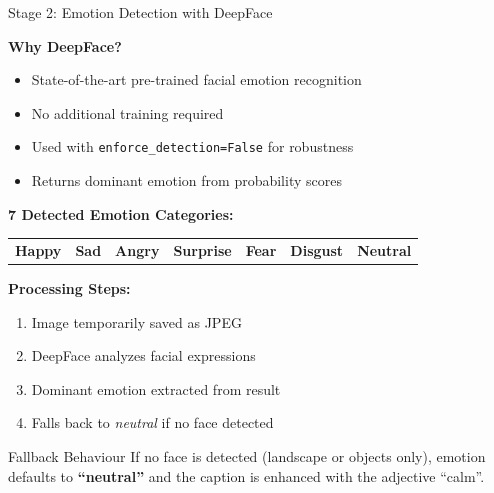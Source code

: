 \documentclass{beamer}
\begin{document}
\begin{frame}{Stage 2: Emotion Detection with DeepFace}

    \textbf{Why DeepFace?}
    \begin{itemize}
        \item State-of-the-art pre-trained facial emotion recognition
        \item No additional training required
        \item Used with \texttt{enforce\_detection=False} for robustness
        \item Returns dominant emotion from probability scores
    \end{itemize}

    \vspace{0.05cm}
    \textbf{7 Detected Emotion Categories:}\\[0.2em]
    \begin{center}
    \begin{tabular}{ccccccc}
    \textcolor{yellow!60!black}{\textbf{Happy}} &
    \textcolor{blue!60!black}{\textbf{Sad}} &
    \textcolor{red!70!black}{\textbf{Angry}} &
    \textcolor{orange!70!black}{\textbf{Surprise}} &
    \textcolor{purple!70!black}{\textbf{Fear}} &
    \textcolor{green!40!black}{\textbf{Disgust}} &
    \textcolor{gray!70!black}{\textbf{Neutral}}
    \end{tabular}
    \end{center}

    \vspace{0.05cm}
    \textbf{Processing Steps:}
    \begin{enumerate}
        \item Image temporarily saved as JPEG
        \item DeepFace analyzes facial expressions
        \item Dominant emotion extracted from result
        \item Falls back to \textit{neutral} if no face detected
    \end{enumerate}

    \vspace{0.2cm}
    \begin{alertblock}{Fallback Behaviour}
        If no face is detected (landscape or objects only), emotion defaults to \textbf{``neutral''} and the caption is enhanced with the adjective ``calm''.
    \end{alertblock}

\end{frame}
\end{document}
